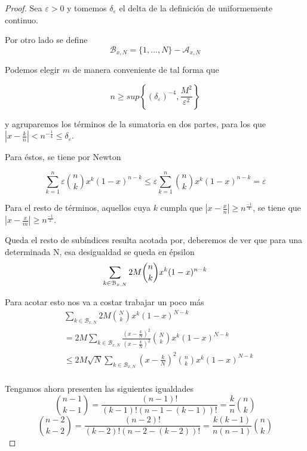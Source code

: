 \begin{proof}
    Sea $\varepsilon > 0$ y tomemos $\delta_ \varepsilon$ el delta de la definición de uniformemente continuo.
    
    Por otro lado se define
    $$\mathcal{B}_{x,N} = \{1, ..., N\} - \mathcal{A}_{x,N}$$


    Podemos elegir $m$ de manera conveniente de tal forma que 

    $$ n \geq sup \left\{ (\delta_\varepsilon) ^{-4}, \frac{M^2}{\varepsilon^2}\right\}$$


    y agruparemos los términos de la sumatoria en dos partes, para los que 
    $|x - \frac{k}{n}| < n^{ -\frac{1}{4}} \leq \delta_\varepsilon$. 

    Para éstos,  se tiene por Newton  

    \begin{equation*}
        \sum_{k=1}^n   \varepsilon \binom{n}{k} x^k (1-x)^{n-k} \leq \varepsilon \sum_{k=1}^n \binom{n}{k} x^k (1-x)^{n-k} =  \varepsilon
    \end{equation*}

    Para el resto de términos, aquellos cuya $k$ cumpla que $|x - \frac{x}{n}| \geq n ^\frac{-1}{4}$, se tiene que 
    $|x - \frac{x}{m}| \geq n ^\frac{-1}{2}$. 

    Queda el resto de subíndices resulta acotada por, deberemos de ver que para una determinada N, 
    esa desigualdad se queda en épsilon
    \begin{equation*}
        \sum_{k \in \mathcal{B}_{x,N}} 2M \binom{n}{k} x^k (1-x) ^{n-k} \\
    \end{equation*}

    Para acotar esto nos va a costar trabajar un poco más 
    \begin{equation*}  \label{eq:Bernstein_caso_a_acotar}
        \begin{split}
        & \sum_{k \in \mathcal{B}_{x,N}} 2M \binom{N}{k} x^k (1-x) ^{N-k} \\
        & = 2M  \sum_{k \in \mathcal{B}_{x,N}}  \frac{(x- \frac{k}{N})^2}{(x- \frac{k}{N})^2} \binom{N}{k} x^k (1-x) ^{N-k} \\
        & \leq 2M \sqrt{N} \sum_{k \in \mathcal{B}_{x,N}}  (x- \frac{k}{N})^2 \binom{n}{k} x^k (1-x) ^{N-k} \\
    \end{split}
    \end{equation*}


    Tengamos ahora presenten las siguientes igualdades 
    \begin{equation} \label{eq:binomio_menos_uno}
        \binom{n-1}{k-1} = \frac{(n-1)!}{(k-1)! (n-1-(k-1))!} = \frac{k}{n} \binom{n}{k}
    \end{equation}
    \begin{equation} \label{eq:binomio_menos_dos}
        \binom{n-2}{k-2} = \frac{(n-2)!}{(k-2)! (n-2-(k-2))!} = \frac{k(k-1)}{n(n-1)} \binom{n}{k}
    \end{equation}


\end{proof}
